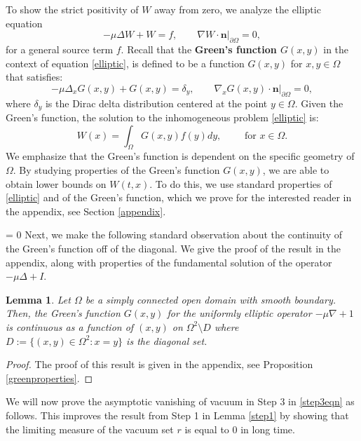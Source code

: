 \documentclass[12pt]{article}
\newcommand{\bd}{\boldsymbol}
\theoremstyle{plain}
\newtheorem{lemma}{Lemma}[section]
\begin{document}
To show the strict positivity of $W$ away from zero, we analyze the elliptic equation
\begin{equation}\label{elliptic}
-\mu \Delta W + W = f, \qquad \nabla W \cdot \bd{n}|_{\partial \Omega} = 0,
\end{equation}
for a general source term $f$. Recall that the \textbf{Green's function $G(x, y)$} in the context of equation \eqref{elliptic}, is defined to be a function $G(x, y)$ for $x, y \in \Omega$ that satisfies:
\begin{equation*}
-\mu \Delta_{x} G(x, y) + G(x, y) = \delta_{y}, \qquad \nabla_{x} G(x, y) \cdot \bd{n}|_{\partial \Omega} = 0,
\end{equation*}
where $\delta_{y}$ is the Dirac delta distribution centered at the point $y \in \Omega$. Given the Green's function, the solution to the inhomogeneous problem \eqref{elliptic} is:
\begin{equation}\label{greenrep}
W(x) = \int_{\Omega} G(x, y) f(y) dy, \qquad \text{ for } x \in \Omega. 
\end{equation}
We emphasize that the Green's function is dependent on the specific geometry of $\Omega$. By studying properties of the Green's function $G(x, y)$, we are able to obtain lower bounds on $W(t, x)$. To do this, we use standard properties of \eqref{elliptic} and of the Green's function, which we prove for the interested reader in the appendix, see Section \ref{appendix}.

 = 0
Next, we make the following standard observation about the continuity of the Green's function off of the diagonal. We give the proof of the result in the appendix, along with properties of the fundamental solution of the operator $-\mu \Delta + I$.

\begin{lemma}
Let $\Omega$ be a simply connected open domain with smooth boundary. Then, the Green's function $G(x, y)$ for the uniformly elliptic operator $-\mu \nabla + 1$ is continuous as a function of $(x, y)$ on $\Omega^{2} \setminus D$ where $D := \{(x, y) \in \Omega^{2} : x = y\}$ is the diagonal set.
\end{lemma}

\begin{proof}
The proof of this result is given in the appendix, see Proposition \ref{greenproperties}.
\end{proof}

\medskip

\fi

We will now prove the asymptotic vanishing of vacuum in Step 3 in \eqref{step3eqn} as follows. This improves the result from Step 1 in Lemma \ref{step1} by showing that the limiting measure of the vacuum set $r$ is equal to $0$ in long time.
\end{document}
